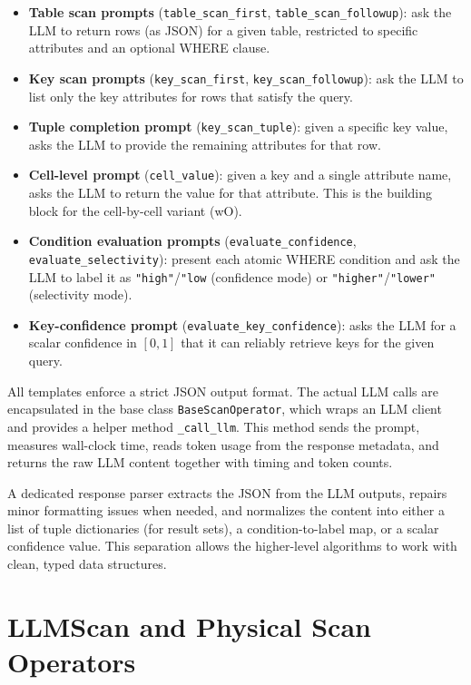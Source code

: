 \documentclass[11pt]{article}
\begin{document}
\begin{itemize}
  \item \textbf{Table scan prompts} (\texttt{table\_scan\_first}, \texttt{table\_scan\_followup}): ask the LLM to return rows (as JSON) for a given table, restricted to specific attributes and an optional WHERE clause.
  \item \textbf{Key scan prompts} (\texttt{key\_scan\_first}, \texttt{key\_scan\_followup}): ask the LLM to list only the key attributes for rows that satisfy the query.
  \item \textbf{Tuple completion prompt} (\texttt{key\_scan\_tuple}): given a specific key value, asks the LLM to provide the remaining attributes for that row.
  \item \textbf{Cell-level prompt} (\texttt{cell\_value}): given a key and a single attribute name, asks the LLM to return the value for that attribute. This is the building block for the cell-by-cell variant (wO).
  \item \textbf{Condition evaluation prompts} (\texttt{evaluate\_confidence}, \texttt{evaluate\_selectivity}): present each atomic WHERE condition and ask the LLM to label it as \texttt{"high"}/\texttt{"low} (confidence mode) or \texttt{"higher"}/\texttt{"lower"} (selectivity mode).
  \item \textbf{Key-confidence prompt} (\texttt{evaluate\_key\_confidence}): asks the LLM for a scalar confidence in $[0,1]$ that it can reliably retrieve keys for the given query.
\end{itemize}

All templates enforce a strict JSON output format. The actual LLM calls are encapsulated in the base class \texttt{BaseScanOperator}, which wraps an LLM client and provides a helper method \texttt{\_call\_llm}. This method sends the prompt, measures wall-clock time, reads token usage from the response metadata, and returns the raw LLM content together with timing and token counts.

A dedicated response parser extracts the JSON from the LLM outputs, repairs minor formatting issues when needed, and normalizes the content into either a list of tuple dictionaries (for result sets), a condition-to-label map, or a scalar confidence value. This separation allows the higher-level algorithms to work with clean, typed data structures.

\section{LLMScan and Physical Scan Operators}
\end{document}

